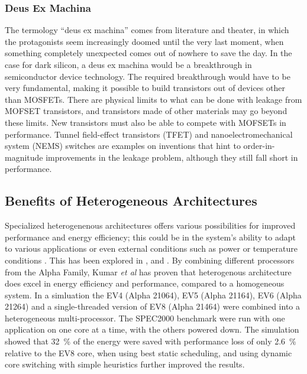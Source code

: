 \subsubsection{Deus Ex Machina}
The termology ``deus ex machina'' comes from literature and theater, in which the protagonists seem increasingly doomed until the very last moment, when something completely unexpected comes out of nowhere to save the day.
In the case for dark silicon, a deus ex machina would be a breakthrough in semiconductor device technology.
The required breakthrough would have to be very fundamental, making it possible to build transistors out of devices other than MOSFETs. 
There are physical limits to what can be done with %
leakage from MOFSET transistors, and transistors made of other materials may go beyond these limits.
New transistors must also be able to compete with MOFSETs in performance.
Tunnel field-effect transistors (TFET) and nanoelectromechanical system (NEMS) switches are examples on inventions that hint to order-in-magnitude improvements in the leakage problem, although they still fall short in performance. \cite{dark-silicon}

\subsection{Benefits of Heterogeneous Architectures}
\label{sec:heterogeneous}

Specialized heterogenenous architectures offers various possibilities for improved performance and energy efficiency;
this could be in the system's ability to adapt to various applications or even external conditions such as
power or temperature conditions \cite{heterogeneous-ee, heterogeneous-perf, heterogeneous-arch}.
This has been explored in \cite{heterogeneous-ee}, \cite{heterogeneous-perf} and \cite{heterogeneous-arch}.
By combining different processors from the Alpha Family, Kumar \textit{et al} has proven that heterogenous architecture does excel in energy efficiency and performance, compared to a homogeneous system.
In a simluation the EV4 (Alpha 21064), EV5 (Alpha 21164), EV6 (Alpha 21264) and a single-threaded version of EV8 (Alpha 21464) were combined into a heterogeneous multi-processor.
The SPEC2000 benchmark were run with one application on one core at a time, with the others powered down.
The simulation showed that 32~\% of the energy were saved with performance loss of only 2.6~\% relative to the EV8 core, when using best static scheduling, and using dynamic core switching with simple heuristics further improved the results. \cite{heterogeneous-ee}

